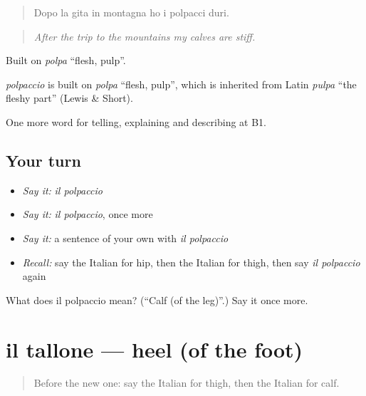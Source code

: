 \begin{quote}
Dopo la gita in montagna ho i polpacci duri.
\end{quote}

\begin{quote}
\emph{After the trip to the mountains my calves are stiff.}
\end{quote}

Built on \emph{polpa} \textquotedblleft{}flesh, pulp\textquotedblright{}.

\begin{cousinweb}
\emph{polpaccio} is built on \emph{polpa} \textquotedblleft{}flesh, pulp\textquotedblright{}, which is inherited from Latin \emph{pulpa} \textquotedblleft{}the fleshy part\textquotedblright{} (Lewis \& Short).
\end{cousinweb}

\begin{grammarlens}[title={What you've built}]
One more word for telling, explaining and describing at B1.
\end{grammarlens}

\subsection*{Your turn}
\begin{itemize}
\raggedright
  \item \emph{Say it:} \emph{il polpaccio}
  \item \emph{Say it:} \emph{il polpaccio}, once more
  \item \emph{Say it:} a sentence of your own with \emph{il polpaccio}
  \item \emph{Recall:} say the Italian for hip, then the Italian for thigh, then say \emph{il polpaccio} again
\end{itemize}

\begin{tcolorbox}[breakable,colback=teal!4,colframe=teal!35!black,title={Before you move on}]
What does il polpaccio mean? (\textquotedblleft{}Calf (of the leg)\textquotedblright{}.) Say it once more.
\end{tcolorbox}
\section[il tallone]{il tallone — heel (of the foot)}

\label{lesson:IT-C481-tallone}



\begin{quote}
Before the new one: say the Italian for thigh, then the Italian for calf.
\end{quote}

